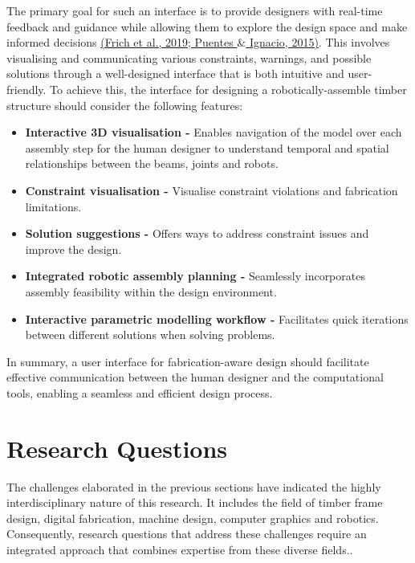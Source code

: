 \documentclass[11pt]{book}
\begin{document}
The primary goal for such an interface is to provide designers with real-time feedback and guidance while allowing them to explore the design space and make informed decisions \href{https://www.zotero.org/google-docs/?5BPzBQ}{(Frich et al., 2019; Puentes $\&$ Ignacio, 2015)}. This involves visualising and communicating various constraints, warnings, and possible solutions through a well-designed interface that is both intuitive and user-friendly. To achieve this, the interface for designing a robotically-assemble timber structure should consider the following features: 

\begin{itemize}
	\item \textbf{Interactive 3D visualisation - }Enables navigation of the model over each assembly step for the human designer to understand temporal and spatial relationships between the beams, joints and robots.

	\item \textbf{Constraint visualisation - }Visualise constraint violations and fabrication limitations. 

	\item \textbf{Solution suggestions - }Offers ways to address constraint issues and improve the design.

	\item \textbf{Integrated robotic assembly planning -} Seamlessly incorporates assembly feasibility within the design environment.

	\item \textbf{Interactive parametric modelling workflow - }Facilitates quick iterations between different solutions when solving problems.

\end{itemize}
In summary, a user interface for fabrication-aware design should facilitate effective communication between the human designer and the computational tools, enabling a seamless and efficient design process. 

\section{Research Questions}

The challenges elaborated in the previous sections have indicated the highly interdisciplinary nature of this research. It includes the field of timber frame design, digital fabrication, machine design, computer graphics and robotics. Consequently, research questions that address these challenges require an integrated approach that combines expertise from these diverse fields..
\end{document}
